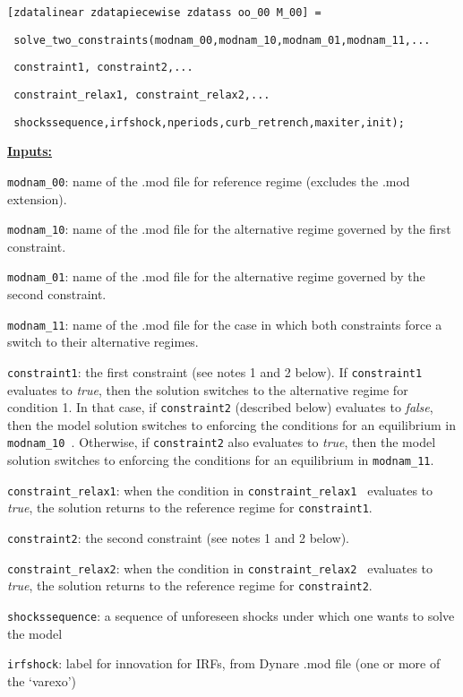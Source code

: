 \documentclass[12pt]{article}
\begin{document}
\begin{enumerate}
\texttt{[zdatalinear zdatapiecewise zdatass oo\_00 M\_00] = }

\texttt{\
solve\_two\_constraints(modnam\_00,modnam\_10,modnam\_01,modnam\_11,...}

\texttt{\ constraint1, constraint2,...}

\texttt{\ constraint\_relax1, constraint\_relax2,...}

\texttt{\ shockssequence,irfshock,nperiods,curb\_retrench,maxiter,init);}

\medskip 

\underline{\textbf{Inputs:}}

\texttt{modnam\_00}: name of the .mod file for reference regime (excludes
the .mod extension).

\texttt{modnam\_10}: name of the .mod file for the alternative regime
governed by the first constraint.

\texttt{modnam\_01}: name of the .mod file for the alternative regime
governed by the second constraint.

\texttt{modnam\_11}: name of the .mod file for the case in which both
constraints force a switch to their alternative regimes.

\texttt{constraint1}: the first constraint (see notes 1 and 2 below). If 
\texttt{constraint1} evaluates to \emph{true}, then the solution switches to
the alternative regime for condition 1. In that case, if \texttt{constraint2}
(described below) evaluates to \emph{false}, then the model solution
switches to enforcing the conditions for an equilibrium in \texttt{modnam\_10%
}. Otherwise, if \texttt{constraint2} also evaluates to \emph{true}, then
the model solution switches to enforcing the conditions for an equilibrium
in \texttt{modnam\_11}.

\texttt{constraint\_relax1}: when the condition in \texttt{constraint\_relax1%
} evaluates to \emph{true}, the solution returns to the reference regime for 
\texttt{constraint1}.

\texttt{constraint2}: the second constraint (see notes 1 and 2 below).

\texttt{constraint\_relax2}: when the condition in \texttt{constraint\_relax2%
} evaluates to \emph{true}, the solution returns to the reference regime for 
\texttt{constraint2}.

\texttt{shockssequence}: a sequence of unforeseen shocks under which one
wants to solve the model

\texttt{irfshock}: label for innovation for IRFs, from Dynare .mod file (one
or more of the `varexo')


\end{enumerate}
\end{document}
